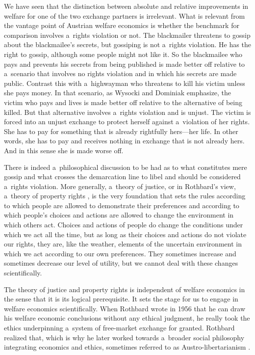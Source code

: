 We have seen that the distinction between absolute and relative improvements in welfare for one of the two exchange partners is irrelevant. What is relevant from the vantage point of Austrian welfare economics is whether the benchmark for comparison involves a~rights violation or not. The blackmailer threatens to gossip about the blackmailee's secrets, but gossiping is not a~rights violation. He has the right to gossip, although some people might not like it. So the blackmailee who pays and prevents his secrets from being published is made better off relative to a~scenario that involves no rights violation and in which his secrets are made public. Contrast this with a~highwayman who threatens to kill his victim unless she pays money. In that scenario, as Wysocki and Dominiak 
\parencite*[][pp.54–55]{wysocki_how_2023} %
 emphasize, the victim who pays and lives is made better off relative to the alternative of being killed. But that alternative involves a~rights violation and is unjust. The victim is forced into an unjust exchange to protect herself against a~violation of her rights. She has to pay for something that is already rightfully hers---her life. In other words, she has to pay and receives nothing in exchange that is not already hers. And in this sense she is made worse off.



There is indeed a~philosophical discussion to be had as to what constitutes mere gossip and what crosses the demarcation line to libel and should be considered a~rights violation. More generally, a~theory of justice, or in Rothbard's view, a~theory of property rights 
\parencite[][]{rothbard_ethics_1998}, %
 is the very foundation that sets the rules according to which people are allowed to demonstrate their preferences and according to which people's choices and actions are allowed to change the environment in which others act. Choices and actions of people do change the conditions under which we act all the time, but as long as their choices and actions do not violate our rights, they are, like the weather, elements of the uncertain environment in which we act according to our own preferences. They sometimes increase and sometimes decrease our level of utility, but we cannot deal with these changes scientifically.



The theory of justice and property rights is independent of welfare economics in the sense that it is its logical prerequisite. It sets the stage for us to engage in welfare economics scientifically. When Rothbard wrote in 1956 that he can draw his welfare economic conclusions without any ethical judgment, he really took the ethics underpinning a~system of free-market exchange for granted. Rothbard realized that, which is why he later worked towards a~broader social philosophy integrating economics and ethics, sometimes referred to as Austro-libertarianism 
\parencite[][]{holcombe_murray_1999}.%




